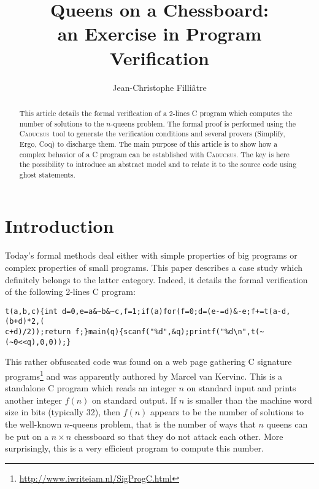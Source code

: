 \documentclass[a4paper]{llncs}
\newcommand{\caduceus}{\textsc{Caduceus}}
\begin{document}
\title{Queens on a Chessboard: \\
       an Exercise in Program Verification}
\author{Jean-Christophe Filli\^atre}
\maketitle

\begin{abstract}
  This article details the formal verification of a 2-lines C program
  which computes the number of solutions to the $n$-queens problem.
  The formal proof is performed using the \caduceus\ tool to generate
  the verification conditions and several provers (Simplify, Ergo,
  Coq) to discharge them. The main purpose of this article is to show
  how a complex behavior of a C program can be established with
  \caduceus. The key is here the possibility to introduce an abstract
  model and to relate it to the source code using ghost statements.
\end{abstract}


\section{Introduction}

Today's formal methods deal either with simple properties of big programs or
complex properties of small programs. This paper describes a case study
which definitely belongs to the latter category.
Indeed, it details the formal verification of the following 2-lines C program:
{\small%
\begin{verbatim}
t(a,b,c){int d=0,e=a&~b&~c,f=1;if(a)for(f=0;d=(e-=d)&-e;f+=t(a-d,(b+d)*2,(
c+d)/2));return f;}main(q){scanf("%d",&q);printf("%d\n",t(~(~0<<q),0,0));}
\end{verbatim}}
\noindent 
This rather obfuscated code was found on a web page gathering C signature
programs\footnote{\url{http://www.iwriteiam.nl/SigProgC.html}} and was
apparently authored by Marcel van Kervinc. This is a standalone C program
which reads an integer $n$ on standard input and prints another
integer $f(n)$ on standard output. If $n$ is smaller than the
machine word size in bits (typically 32), then
$f(n)$ appears to be the number of solutions to the well-known $n$-queens
problem, that is the number of ways that $n$ queens can be put on a $n\times n$
chessboard so that they do not attack each other. More
surprisingly, this is a very efficient program to compute this number.
\end{document}
